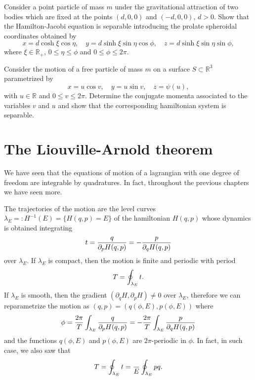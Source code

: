 \documentclass[english,fontsize=11pt,paper=a5,oneside]{scrbook}
\newcommand{\R}{\mathbb{R}}
\let\d\relax
\DeclareMathOperator{\d}{d}
\theoremstyle{definition}
\newenvironment{exercise}
  {\pushQED{\qed}\renewcommand{\qedsymbol}{$\maltese$}\exercisex}
  {\popQED\endexercisex}
\begin{document}
\begin{exercise}[Prolate spheroidal coordinates]
    Consider a point particle of mass $m$ under the gravitational attraction of two bodies which are fixed at the points $(d,0,0)$ and $(-d,0,0)$, $d>0$.
    Show that the Hamilton-Jacobi equation is separable introducing the prolate spheroidal coordinates obtained by
    \begin{equation}
        x = d \cosh\xi \cos\eta, \quad
        y = d \sinh\xi \sin\eta \cos\phi, \quad
        z = d \sinh\xi \sin\eta \sin\phi,
    \end{equation}
    where $\xi\in\R_+$, $0\leq\eta\leq\phi$ and $0\leq\phi\leq 2\pi$.
\end{exercise}

\begin{exercise}
    Consider the motion of a free particle of mass $m$ on a surface $S\subset\R^3$ parametrized by
    \begin{equation}
        x = u \cos v, \quad
        y = u \sin v, \quad
        z = \psi(u),
    \end{equation}
    with $u\in\R$ and $0\leq v\leq 2\pi$.
    Determine the conjugate momenta associated to the variables $v$ and $u$ and show that the corresponding hamiltonian system is separable.
\end{exercise}

\section{The Liouville-Arnold theorem}\label{sec:intsys}

We have seen that the equations of motion of a lagrangian with one degree of freedom are integrable by quadratures.
In fact, throughout the previous chapters we have seen more.

The trajectories of the motion are the level curves $\lambda_E =: H^{-1}(E) = \{H(q,p) = E\}$ of the hamiltonian $H(q,p)$ whose dynamics is obtained integrating
\begin{equation}
    \d t = \frac{\d q}{\partial_p H(q,p)} = - \frac{\d p}{\partial_q H(q,p)}
\end{equation}
over $\lambda_E$.
If $\lambda_E$ is compact, then the motion is finite and periodic with period
\begin{equation}
    T = \oint_{\lambda_E}\d t.
\end{equation}
If $\lambda_E$ is smooth, then the gradient $(\partial_q H, \partial_p H)\neq 0$ over $\lambda_E$, therefore we can reparametrize the motion as $(q,p) = (q(\phi, E), p(\phi, E))$ where
\begin{equation}\label{eq:phirep1d}
    \phi = \frac{2\pi}{T}\int_{\lambda_E} \frac{\d q}{\partial_p H(q,p)} = -\frac{2\pi}{T}\int_{\lambda_E} \frac{\d p}{\partial_q H(q,p)}
\end{equation}
and the functions $q(\phi, E)$ and $p(\phi, E)$ are $2\pi$-periodic in $\phi$.
In fact, in such case, we also saw that
\begin{equation}
    T = \oint_{\lambda_E}\d t = \frac{\d}{\d E} \oint_{\lambda_E} p\d q.
\end{equation}
\end{document}
